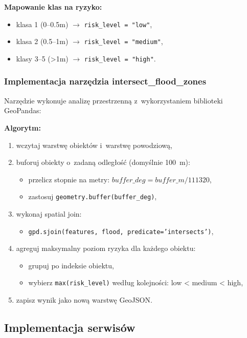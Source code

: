 \textbf{Mapowanie klas na ryzyko:}
\begin{itemize}
    \item klasa 1 (0--0.5m) $\rightarrow$ \texttt{risk\_level = "low"},
    \item klasa 2 (0.5--1m) $\rightarrow$ \texttt{risk\_level = "medium"},
    \item klasy 3--5 (>1m) $\rightarrow$ \texttt{risk\_level = "high"}.
\end{itemize}

\subsubsection{Implementacja narzędzia intersect\_flood\_zones}

Narzędzie wykonuje analizę przestrzenną z~wykorzystaniem biblioteki GeoPandas:

\textbf{Algorytm:}
\begin{enumerate}
    \item wczytaj warstwę obiektów i~warstwę powodziową,
    \item buforuj obiekty o~zadaną odległość (domyślnie 100~m):
    \begin{itemize}
        \item przelicz stopnie na metry: $buffer\_deg = buffer\_m / 111320$,
        \item zastosuj \texttt{geometry.buffer(buffer\_deg)},
    \end{itemize}
    \item wykonaj spatial join:
    \begin{itemize}
        \item \texttt{gpd.sjoin(features, flood, predicate='intersects')},
    \end{itemize}
    \item agreguj maksymalny poziom ryzyka dla każdego obiektu:
    \begin{itemize}
        \item grupuj po indeksie obiektu,
        \item wybierz \texttt{max(risk\_level)} według kolejności: low < medium < high,
    \end{itemize}
    \item zapisz wynik jako nową warstwę GeoJSON.
\end{enumerate}

\subsection{Implementacja serwisów}

